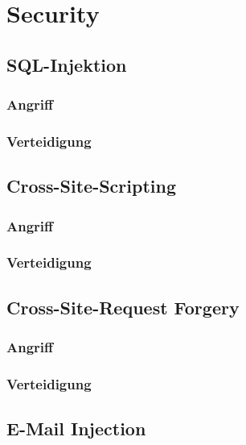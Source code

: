 \chapter{Security}
\label{cha:security}



\section{SQL-Injektion}
\blindtext

\subsection{Angriff}
\blindtext

\subsection{Verteidigung}
\blindtext


\section{Cross-Site-Scripting}
\blindtext

\subsection{Angriff}
\blindtext

\subsection{Verteidigung}
\blindtext


\section{Cross-Site-Request Forgery}
\blindtext

\subsection{Angriff}
\blindtext

\subsection{Verteidigung}
\blindtext


\section{E-Mail Injection}
\blindtext


